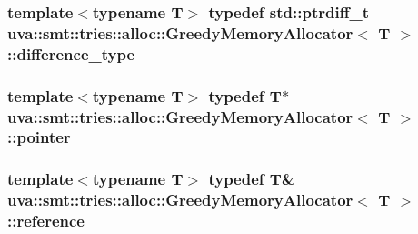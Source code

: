 \subsubsection[{difference\+\_\+type}]{\setlength{\rightskip}{0pt plus 5cm}template$<$typename T$>$ typedef std\+::ptrdiff\+\_\+t {\bf uva\+::smt\+::tries\+::alloc\+::\+Greedy\+Memory\+Allocator}$<$ T $>$\+::{\bf difference\+\_\+type}}\label{classuva_1_1smt_1_1tries_1_1alloc_1_1_greedy_memory_allocator_a14467f640838b0667457750468f433cc}
\hypertarget{classuva_1_1smt_1_1tries_1_1alloc_1_1_greedy_memory_allocator_ad82be226faea1278f210654317249483}{}
\subsubsection[{pointer}]{\setlength{\rightskip}{0pt plus 5cm}template$<$typename T$>$ typedef T$\ast$ {\bf uva\+::smt\+::tries\+::alloc\+::\+Greedy\+Memory\+Allocator}$<$ T $>$\+::{\bf pointer}}\label{classuva_1_1smt_1_1tries_1_1alloc_1_1_greedy_memory_allocator_ad82be226faea1278f210654317249483}
\hypertarget{classuva_1_1smt_1_1tries_1_1alloc_1_1_greedy_memory_allocator_a62f7001b75a49f4711f5b06900642f8b}{}
\subsubsection[{reference}]{\setlength{\rightskip}{0pt plus 5cm}template$<$typename T$>$ typedef T\& {\bf uva\+::smt\+::tries\+::alloc\+::\+Greedy\+Memory\+Allocator}$<$ T $>$\+::{\bf reference}}\label{classuva_1_1smt_1_1tries_1_1alloc_1_1_greedy_memory_allocator_a62f7001b75a49f4711f5b06900642f8b}
\hypertarget{classuva_1_1smt_1_1tries_1_1alloc_1_1_greedy_memory_allocator_a76d81ff5df20ef0404bb2027016b8b2d}{}
